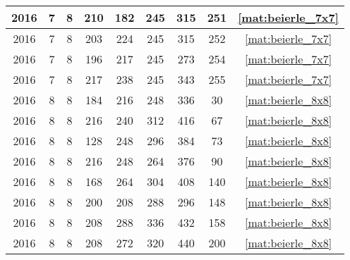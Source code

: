 \begin{longtable}{|c|c|c|c|c|c|c|c|c|}
2016 & 7 & 8 & 210 & 182 & 245 & 315 & 251 & \eqref{mat:beierle_7x7} \\ \hline 
2016 & 7 & 8 & 203 & 224 & 245 & 315 & 252 & \eqref{mat:beierle_7x7} \\ \hline 
2016 & 7 & 8 & 196 & 217 & 245 & 273 & 254 & \eqref{mat:beierle_7x7} \\ \hline 
2016 & 7 & 8 & 217 & 238 & 245 & 343 & 255 & \eqref{mat:beierle_7x7} \\ \hline 
2016 & 8 & 8 & 184 & 216 & 248 & 336 & 30 & \eqref{mat:beierle_8x8} \\ \hline 
2016 & 8 & 8 & 216 & 240 & 312 & 416 & 67 & \eqref{mat:beierle_8x8} \\ \hline 
2016 & 8 & 8 & 128 & 248 & 296 & 384 & 73 & \eqref{mat:beierle_8x8} \\ \hline 
2016 & 8 & 8 & 216 & 248 & 264 & 376 & 90 & \eqref{mat:beierle_8x8} \\ \hline 
2016 & 8 & 8 & 168 & 264 & 304 & 408 & 140 & \eqref{mat:beierle_8x8} \\ \hline 
2016 & 8 & 8 & 200 & 208 & 288 & 296 & 148 & \eqref{mat:beierle_8x8} \\ \hline 
2016 & 8 & 8 & 208 & 288 & 336 & 432 & 158 & \eqref{mat:beierle_8x8} \\ \hline 
2016 & 8 & 8 & 208 & 272 & 320 & 440 & 200 & \eqref{mat:beierle_8x8} \\ \hline 
\end{longtable}
